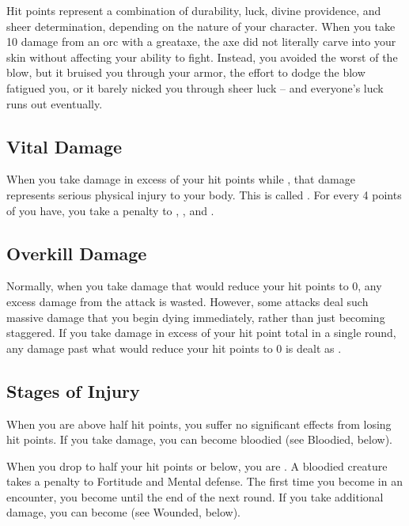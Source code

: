          Hit points represent a combination of durability, luck, divine providence, and sheer determination, depending on the nature of your character.
        When you take 10 damage from an orc with a greataxe, the axe did not literally carve into your skin without affecting your ability to fight.
        Instead, you avoided the worst of the blow, but it bruised you through your armor, the effort to dodge the blow fatigued you, or it barely nicked you through sheer luck -- and everyone's luck runs out eventually.

    \subsection{Vital Damage}\label{Vital Damage}
        When you take damage in excess of your hit points while , that damage represents serious physical injury to your body.
        This is called .
        For every 4 points of  you have, you take a  penalty to , , and .

    \subsection{Overkill Damage}\label{Overkill Damage}
        Normally, when you take damage that would reduce your hit points to 0, any excess damage from the attack is wasted.
        However, some attacks deal such massive damage that you begin dying immediately, rather than just becoming staggered.
        If you take damage in excess of your  hit point total in a single round, any damage past what would reduce your hit points to 0 is dealt as .

    \subsection{Stages of Injury}

         When you are above half hit points, you suffer no significant effects from losing hit points.
        If you take damage, you can become bloodied (see Bloodied, below).

         When you drop to half your hit points or below, you are \bloodied.
        A bloodied creature takes a  penalty to Fortitude and Mental defense.
        The first time you become  in an encounter, you become  until the end of the next round.
        If you take additional damage, you can become  (see Wounded, below).

